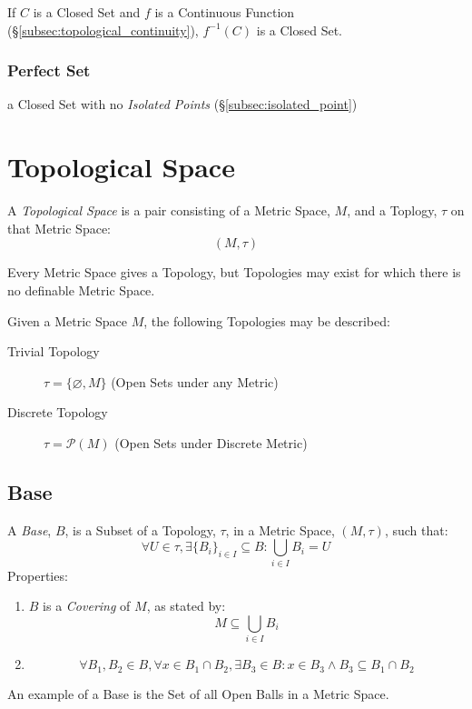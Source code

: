 \documentclass{article}
\begin{document}
If $C$ is a Closed Set and $f$ is a Continuous Function
(\S\ref{subsec:topological_continuity}), $f^{-1}(C)$ is a Closed Set.



\subsubsection{Perfect Set}

a Closed Set with no \emph{Isolated Points}
(\S\ref{subsec:isolated_point})



\section{Topological Space}\label{sec:topological_space}

A \emph{Topological Space} is a pair consisting of a Metric Space,
$M$, and a Toplogy, $\tau$ on that Metric Space:
\[
    (M,\tau)
\]

Every Metric Space gives a Topology, but Topologies may exist for
which there is no definable Metric Space. %

Given a Metric Space $M$, the following Topologies may be described:
\begin{description}
\item[Trivial Topology] $\tau = \{\varnothing, M\}$ (Open Sets under
  any Metric)

\item[Discrete Topology] $\tau = \mathcal{P}(M)$ (Open Sets under
  Discrete Metric)
\end{description}



\subsection{Base}\label{subsec:topological_base}

A \emph{Base}, $B$, is a Subset of a Topology, $\tau$, in a Metric
Space, $(M,\tau)$, such that:
\[
    \forall U \in \tau, \exists \{B_i\}_{i \in I} \subseteq B :
    \bigcup_{i \in I}B_i = U
\]
Properties:
\begin{enumerate}
    \item $B$ is a \emph{Covering} of $M$, as stated by:
\[
    M \subseteq \bigcup_{i \in I} B_i
\]

    \item
\[
    \forall B_1, B_2 \in B, \forall x \in B_1 \cap B_2,
    \exists B_3 \in B : x \in B_3 \wedge B_3 \subseteq B_1 \cap B_2
\]

\end{enumerate}
An example of a Base is the Set of all Open Balls in a Metric Space.
\end{document}
